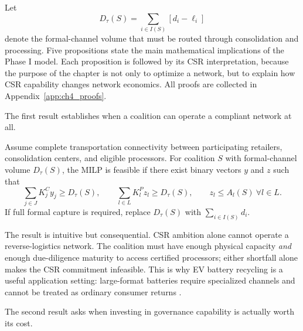 Let
\begin{equation}
\label{eq:ch4_formal_demand}
D_\tau(S)=\sum_{i\in I(S)}\left[d_i-\ell_i\right]
\end{equation}
denote the formal-channel volume that must be routed through consolidation and processing. Five propositions state the main mathematical implications of the Phase I model. Each proposition is followed by its CSR interpretation, because the purpose of the chapter is not only to optimize a network, but to explain how CSR capability changes network economics. All proofs are collected in Appendix~\ref{app:ch4_proofs}.

The first result establishes when a coalition can operate a compliant network at all.

\begin{proposition}
\label{prop:ch4_feasibility}
Assume complete transportation connectivity between participating retailers, consolidation centers, and eligible processors. For coalition $S$ with formal-channel volume $D_\tau(S)$, the MILP is feasible if there exist binary vectors $y$ and $z$ such that
\begin{equation}
\label{eq:ch4_feasibility_condition}
\sum_{j\in J}K_j^C y_j\geq D_\tau(S),
\qquad
\sum_{l\in L}K_l^P z_l\geq D_\tau(S),
\qquad
z_l\leq A_l(S)\ \forall l\in L.
\end{equation}
If full formal capture is required, replace $D_\tau(S)$ with $\sum_{i\in I(S)}d_i$.
\end{proposition}

The result is intuitive but consequential. CSR ambition alone cannot operate a reverse-logistics network. The coalition must have enough physical capacity \emph{and} enough due-diligence maturity to access certified processors; either shortfall alone makes the CSR commitment infeasible. This is why EV battery recycling is a useful application setting: large-format batteries require specialized channels and cannot be treated as ordinary consumer returns \cite{EPA2026UsedLithiumIon,EPA2026UniversalWaste}.

The second result asks when investing in governance capability is actually worth its cost.

